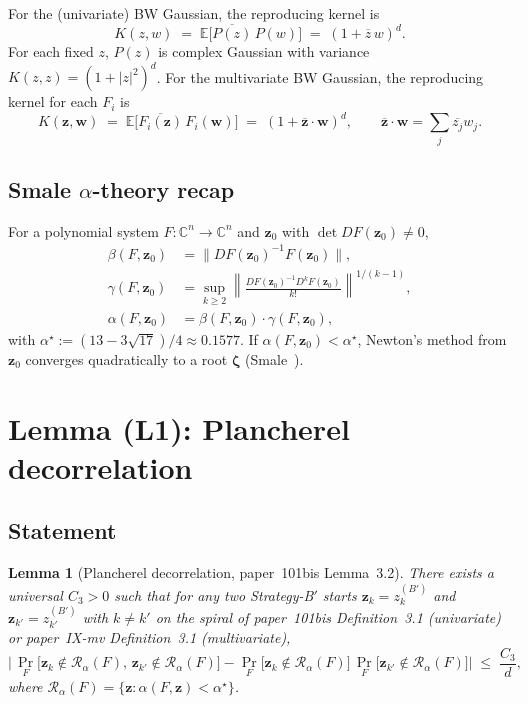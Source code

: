 \documentclass[11pt,a4paper]{article}
\newtheorem{lemma}[theorem]{Lemma}
\begin{document}
For the (univariate) BW Gaussian, the reproducing kernel is
\begin{equation}\label{eq:K-univariate}
K(z, w) \;=\; \mathbb{E}\!\bigl[\overline{P(z)} \, P(w)\bigr] \;=\; (1 + \overline z\, w)^{d}.
\end{equation}
For each fixed $z$, $P(z)$ is complex Gaussian with variance $K(z, z) = (1 + |z|^2)^d$.
For the multivariate BW Gaussian, the reproducing kernel for each $F_i$ is
\begin{equation}\label{eq:K-multivariate}
K(\mathbf{z}, \mathbf{w}) \;=\; \mathbb{E}\!\bigl[\overline{F_i(\mathbf z)}\, F_i(\mathbf w)\bigr] \;=\; (1 + \overline{\mathbf z}\cdot \mathbf w)^d, \qquad \overline{\mathbf z}\cdot\mathbf w = \sum_j \overline{z_j} w_j.
\end{equation}

\subsection{Smale $\alpha$-theory recap}

For a polynomial system $F: \mathbb{C}^n \to \mathbb{C}^n$ and $\mathbf z_0$ with $\det DF(\mathbf z_0) \ne 0$,
\begin{align*}
\beta(F, \mathbf z_0) &= \|DF(\mathbf z_0)^{-1} F(\mathbf z_0)\|, \\
\gamma(F, \mathbf z_0) &= \sup_{k \ge 2} \left\|\frac{DF(\mathbf z_0)^{-1} D^k F(\mathbf z_0)}{k!}\right\|^{1/(k-1)}, \\
\alpha(F, \mathbf z_0) &= \beta(F, \mathbf z_0) \cdot \gamma(F, \mathbf z_0),
\end{align*}
with $\alpha^\star := (13 - 3\sqrt{17})/4 \approx 0.1577$. If $\alpha(F, \mathbf z_0) < \alpha^\star$, Newton's method from $\mathbf z_0$ converges quadratically to a root $\boldsymbol\zeta$ (Smale~\cite{smale1986}).

\section{Lemma (L1): Plancherel decorrelation}\label{sec:plancherel}

\subsection{Statement}

\begin{lemma}[Plancherel decorrelation, paper~101bis Lemma~3.2]\label{lem:plancherel}
There exists a universal $C_3 > 0$ such that for any two Strategy-B$'$ starts $\mathbf z_k = z_k^{(B')}$ and $\mathbf z_{k'} = z_{k'}^{(B')}$ with $k \ne k'$ on the spiral of paper~101bis Definition~3.1 (univariate) or paper~IX-mv Definition~3.1 (multivariate),
\begin{equation}\label{eq:plancherel-bound}
\bigl|\,\Pr_{F}\!\bigl[\mathbf z_k \notin \mathcal R_\alpha(F),\, \mathbf z_{k'} \notin \mathcal R_\alpha(F)\bigr] - \Pr_{F}\!\bigl[\mathbf z_k \notin \mathcal R_\alpha(F)\bigr] \, \Pr_{F}\!\bigl[\mathbf z_{k'} \notin \mathcal R_\alpha(F)\bigr]\bigr| \;\le\; \frac{C_3}{d},
\end{equation}
where $\mathcal R_\alpha(F) = \{\mathbf z : \alpha(F, \mathbf z) < \alpha^\star\}$.
\end{lemma}
\end{document}
